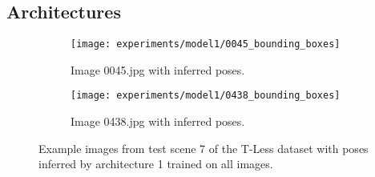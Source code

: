 \subsection{Architectures} \label{subsection:architectures}

\begin{figure}[!b]
	\begin{subfigure}[t]{0.47\textwidth}
		\centering
    	\texttt{[image: experiments/model1/0045\_bounding\_boxes]}
    	\caption{Image 0045.jpg with inferred poses.}
	\end{subfigure} 
	\hfill
	\begin{subfigure}[t]{0.47\textwidth}
		\centering
    	\texttt{[image: experiments/model1/0438\_bounding\_boxes]}
    	\caption{Image 0438.jpg with inferred poses.}
	\end{subfigure} 
	\caption{Example images from test scene 7 of the T-Less dataset with poses inferred by architecture 1 trained on all images.}
	\label{fig:architecture_experiments_example_frames}
\end{figure} 

